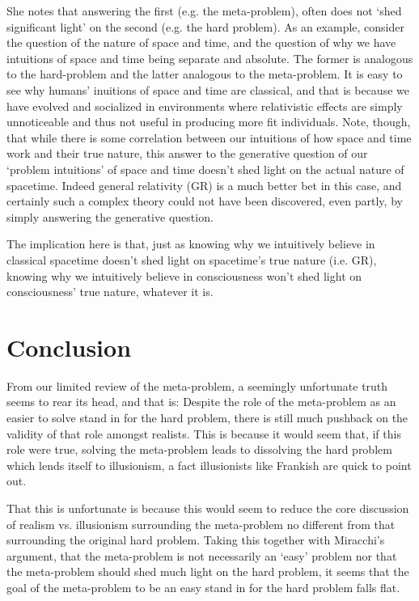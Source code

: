 \documentclass[11pt]{article}
\begin{document}
She notes that answering the first (e.g. the meta-problem), often does not `shed significant light' on the second (e.g. the hard problem). As an example, consider the question of the nature of space and time, and the question of why we have intuitions of space and time being separate and absolute. The former is analogous to the hard-problem and the latter analogous to the meta-problem. It is easy to see why humans' inuitions of space and time are classical, and that is because we have evolved and socialized in environments where relativistic effects are simply unnoticeable and thus not useful in producing more fit individuals. Note, though, that while there is some correlation between our intuitions of how space and time work and their true nature, this answer to the generative question of our `problem intuitions' of space and time doesn't shed light on the actual nature of spacetime. Indeed general relativity (GR) is a much better bet in this case, and certainly such a complex theory could not have been discovered, even partly, by simply answering the generative question.

The implication here is that, just as knowing why we intuitively believe in classical spacetime doesn't shed light on spacetime's true nature (i.e. GR), knowing why we intuitively believe in consciousness won't shed light on consciousness' true nature, whatever it is.

\section*{Conclusion}
From our limited review of the meta-problem, a seemingly unfortunate truth seems to rear its head, and that is: Despite the role of the meta-problem as an easier to solve stand in for the hard problem, there is still much pushback on the validity of that role amongst realists. This is because it would seem that, if this role were true, solving the meta-problem leads to dissolving the hard problem which lends itself to illusionism, a fact illusionists like Frankish are quick to point out.

That this is unfortunate is because this would seem to reduce the core discussion of realism vs. illusionism surrounding the meta-problem no different from that surrounding the original hard problem. Taking this together with Miracchi's argument, that the meta-problem is not necessarily an `easy' problem nor that the meta-problem should shed much light on the hard problem, it seems that the goal of the meta-problem to be an easy stand in for the hard problem falls flat.
\end{document}
